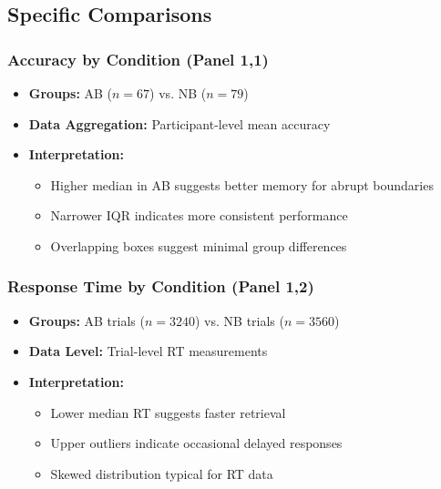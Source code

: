\documentclass[12pt,a4paper]{article}
\begin{document}
\subsection{Specific Comparisons}

\subsubsection{Accuracy by Condition (Panel 1,1)}
\begin{itemize}
    \item \textbf{Groups:} AB ($n=67$) vs. NB ($n=79$)
    \item \textbf{Data Aggregation:} Participant-level mean accuracy
    \item \textbf{Interpretation:}
        \begin{itemize}
            \item Higher median in AB suggests better memory for abrupt boundaries
            \item Narrower IQR indicates more consistent performance
            \item Overlapping boxes suggest minimal group differences
        \end{itemize}
\end{itemize}

\subsubsection{Response Time by Condition (Panel 1,2)}
\begin{itemize}
    \item \textbf{Groups:} AB trials ($n=3240$) vs. NB trials ($n=3560$)
    \item \textbf{Data Level:} Trial-level RT measurements
    \item \textbf{Interpretation:}
        \begin{itemize}
            \item Lower median RT suggests faster retrieval
            \item Upper outliers indicate occasional delayed responses
            \item Skewed distribution typical for RT data
        \end{itemize}
\end{itemize}
\end{document}
